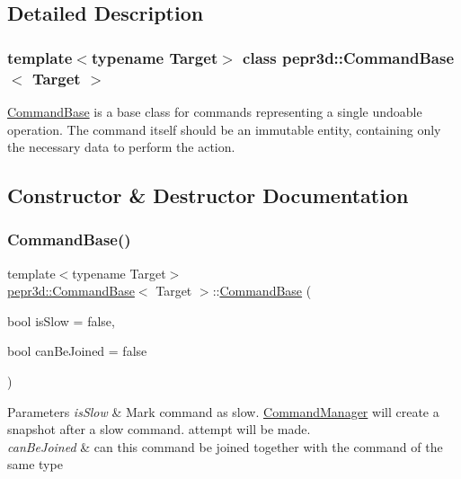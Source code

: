 \subsection{Detailed Description}
\subsubsection*{template$<$typename Target$>$\newline
class pepr3d\+::\+Command\+Base$<$ Target $>$}

\mbox{\hyperlink{classpepr3d_1_1_command_base}{Command\+Base}} is a base class for commands representing a single undoable operation. The command itself should be an immutable entity, containing only the necessary data to perform the action. 

\subsection{Constructor \& Destructor Documentation}
\mbox{\label{classpepr3d_1_1_command_base_aa4644cac610c68ac671fbf04af61186f}} 
\subsubsection{\texorpdfstring{CommandBase()}{CommandBase()}}
{\footnotesize\ttfamily template$<$typename Target$>$ \\
\mbox{\hyperlink{classpepr3d_1_1_command_base}{pepr3d\+::\+Command\+Base}}$<$ Target $>$\+::\mbox{\hyperlink{classpepr3d_1_1_command_base}{Command\+Base}} (\begin{DoxyParamCaption}\item[{bool}]{is\+Slow = {\ttfamily false},  }\item[{bool}]{can\+Be\+Joined = {\ttfamily false} }\end{DoxyParamCaption})\hspace{0.3cm}{\ttfamily [inline]}}


\begin{DoxyParams}{Parameters}
{\em is\+Slow} & Mark command as slow. \mbox{\hyperlink{classpepr3d_1_1_command_manager}{Command\+Manager}} will create a snapshot after a slow command. attempt will be made. \\
\hline
{\em can\+Be\+Joined} & can this command be joined together with the command of the same type \\
\hline
\end{DoxyParams}


